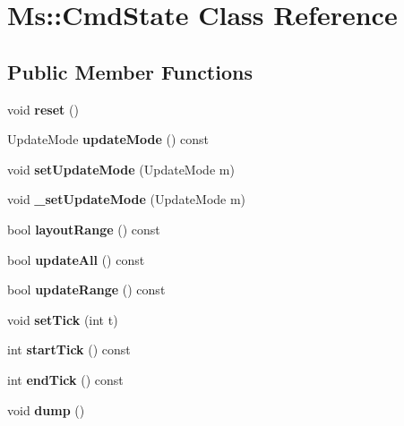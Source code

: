 \hypertarget{class_ms_1_1_cmd_state}{}\section{Ms\+:\+:Cmd\+State Class Reference}
\label{class_ms_1_1_cmd_state}
\subsection*{Public Member Functions}
\begin{DoxyCompactItemize}
\item 
\mbox{\label{class_ms_1_1_cmd_state_a2acb9db8515f9404b88ef0722636bfc7}} 
void {\bfseries reset} ()
\item 
\mbox{\label{class_ms_1_1_cmd_state_a12dcc5e7895513b8395fe280eeb5dca6}} 
Update\+Mode {\bfseries update\+Mode} () const
\item 
\mbox{\label{class_ms_1_1_cmd_state_a8a260dfe1c3f2252aa4f8b598d10e4f1}} 
void {\bfseries set\+Update\+Mode} (Update\+Mode m)
\item 
\mbox{\label{class_ms_1_1_cmd_state_abe580d16099ea516af1a0ec953700aec}} 
void {\bfseries \+\_\+set\+Update\+Mode} (Update\+Mode m)
\item 
\mbox{\label{class_ms_1_1_cmd_state_a409c49e87c60627e63d1c511856452d5}} 
bool {\bfseries layout\+Range} () const
\item 
\mbox{\label{class_ms_1_1_cmd_state_adaf10e3d0e04321d5d8a7cd0a4f3e5a1}} 
bool {\bfseries update\+All} () const
\item 
\mbox{\label{class_ms_1_1_cmd_state_af350f10b9a7e2f5f5ebb8a9b46410a9f}} 
bool {\bfseries update\+Range} () const
\item 
\mbox{\label{class_ms_1_1_cmd_state_ab3374327d93db71831f7d58af5f7d920}} 
void {\bfseries set\+Tick} (int t)
\item 
\mbox{\label{class_ms_1_1_cmd_state_a0fb5510b32bb2bdddb73a6924871de9e}} 
int {\bfseries start\+Tick} () const
\item 
\mbox{\label{class_ms_1_1_cmd_state_ab912ef96a5491307c285ff24bfb633eb}} 
int {\bfseries end\+Tick} () const
\item 
\mbox{\label{class_ms_1_1_cmd_state_ae0ed42425798679e05adb9447dd58a9a}} 
void {\bfseries dump} ()
\end{DoxyCompactItemize}
